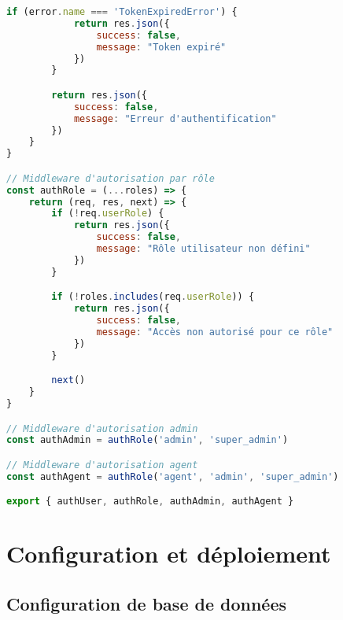\begin{lstlisting}[language=JavaScript, caption=authMiddleware.js - Vérification des tokens JWT]
        if (error.name === 'TokenExpiredError') {
            return res.json({ 
                success: false, 
                message: "Token expiré" 
            })
        }

        return res.json({ 
            success: false, 
            message: "Erreur d'authentification" 
        })
    }
}

// Middleware d'autorisation par rôle
const authRole = (...roles) => {
    return (req, res, next) => {
        if (!req.userRole) {
            return res.json({ 
                success: false, 
                message: "Rôle utilisateur non défini" 
            })
        }

        if (!roles.includes(req.userRole)) {
            return res.json({ 
                success: false, 
                message: "Accès non autorisé pour ce rôle" 
            })
        }

        next()
    }
}

// Middleware d'autorisation admin
const authAdmin = authRole('admin', 'super_admin')

// Middleware d'autorisation agent
const authAgent = authRole('agent', 'admin', 'super_admin')

export { authUser, authRole, authAdmin, authAgent }
\end{lstlisting}

\section{Configuration et déploiement}

\subsection{Configuration de base de données}

